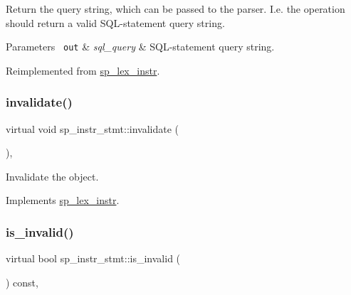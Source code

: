Return the query string, which can be passed to the parser. I.\+e. the operation should return a valid S\+QL-\/statement query string.


\begin{DoxyParams}[1]{Parameters}
\mbox{\texttt{ out}}  & {\em sql\+\_\+query} & S\+QL-\/statement query string. \\
\hline
\end{DoxyParams}


Reimplemented from \mbox{\hyperlink{classsp__lex__instr_a8bbcccae8739634565f8be2134171b03}{sp\+\_\+lex\+\_\+instr}}.

\mbox{\label{classsp__instr__stmt_a15924975452f322b5d8216b3b8279988}} 
\subsubsection{\texorpdfstring{invalidate()}{invalidate()}}
{\footnotesize\ttfamily virtual void sp\+\_\+instr\+\_\+stmt\+::invalidate (\begin{DoxyParamCaption}{ }\end{DoxyParamCaption})\hspace{0.3cm}{\ttfamily [inline]}, {\ttfamily [virtual]}}

Invalidate the object. 

Implements \mbox{\hyperlink{classsp__lex__instr_ae9945d69ab5d91d6ce215f194beea882}{sp\+\_\+lex\+\_\+instr}}.

\mbox{\label{classsp__instr__stmt_aeadeb9c91a52db353dceab5586ed511e}} 
\subsubsection{\texorpdfstring{is\+\_\+invalid()}{is\_invalid()}}
{\footnotesize\ttfamily virtual bool sp\+\_\+instr\+\_\+stmt\+::is\+\_\+invalid (\begin{DoxyParamCaption}{ }\end{DoxyParamCaption}) const\hspace{0.3cm}{\ttfamily [inline]}, {\ttfamily [virtual]}}


